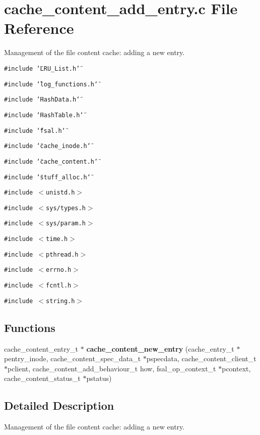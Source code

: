 \section{cache\_\-content\_\-add\_\-entry.c File Reference}
\label{cache__content__add__entry_8c}
Management of the file content cache: adding a new entry. 

{\tt \#include \char`\"{}LRU\_\-List.h\char`\"{}}\par
{\tt \#include \char`\"{}log\_\-functions.h\char`\"{}}\par
{\tt \#include \char`\"{}Hash\-Data.h\char`\"{}}\par
{\tt \#include \char`\"{}Hash\-Table.h\char`\"{}}\par
{\tt \#include \char`\"{}fsal.h\char`\"{}}\par
{\tt \#include \char`\"{}cache\_\-inode.h\char`\"{}}\par
{\tt \#include \char`\"{}cache\_\-content.h\char`\"{}}\par
{\tt \#include \char`\"{}stuff\_\-alloc.h\char`\"{}}\par
{\tt \#include $<$unistd.h$>$}\par
{\tt \#include $<$sys/types.h$>$}\par
{\tt \#include $<$sys/param.h$>$}\par
{\tt \#include $<$time.h$>$}\par
{\tt \#include $<$pthread.h$>$}\par
{\tt \#include $<$errno.h$>$}\par
{\tt \#include $<$fcntl.h$>$}\par
{\tt \#include $<$string.h$>$}\par
\subsection*{Functions}
\begin{CompactItemize}
\item 
cache\_\-content\_\-entry\_\-t $\ast$ {\bf cache\_\-content\_\-new\_\-entry} (cache\_\-entry\_\-t $\ast$pentry\_\-inode, cache\_\-content\_\-spec\_\-data\_\-t $\ast$pspecdata, cache\_\-content\_\-client\_\-t $\ast$pclient, cache\_\-content\_\-add\_\-behaviour\_\-t how, fsal\_\-op\_\-context\_\-t $\ast$pcontext, cache\_\-content\_\-status\_\-t $\ast$pstatus)
\end{CompactItemize}


\subsection{Detailed Description}
Management of the file content cache: adding a new entry. 

